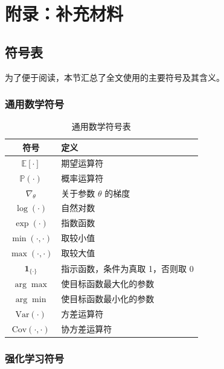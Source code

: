 \chapter{附录：补充材料}
\label{chap:appendix}

\section{符号表}
\label{sec:appendix_symbols}

为了便于阅读，本节汇总了全文使用的主要符号及其含义。

\subsection{通用数学符号}

\begin{table}[htbp]
    \centering
    \caption{通用数学符号表}\label{tab:math_symbols}
    \begin{tabular}{cl}
    \hline
    \textbf{符号} & \textbf{定义} \\
    \hline
    $\mathbb{E}[\cdot]$ & 期望运算符 \\
    $\mathbb{P}(\cdot)$ & 概率运算符 \\
    $\nabla_\theta$ & 关于参数 $\theta$ 的梯度 \\
    $\log(\cdot)$ & 自然对数 \\
    $\exp(\cdot)$ & 指数函数 \\
    $\min(\cdot, \cdot)$ & 取较小值 \\
    $\max(\cdot, \cdot)$ & 取较大值 \\
    $\mathbf{1}_{\{\cdot\}}$ & 指示函数，条件为真取 1，否则取 0 \\
    $\arg\max$ & 使目标函数最大化的参数 \\
    $\arg\min$ & 使目标函数最小化的参数 \\
    $\mathrm{Var}(\cdot)$ & 方差运算符 \\
    $\mathrm{Cov}(\cdot, \cdot)$ & 协方差运算符 \\
    \hline
    \end{tabular}
\end{table}

\subsection{强化学习符号}

